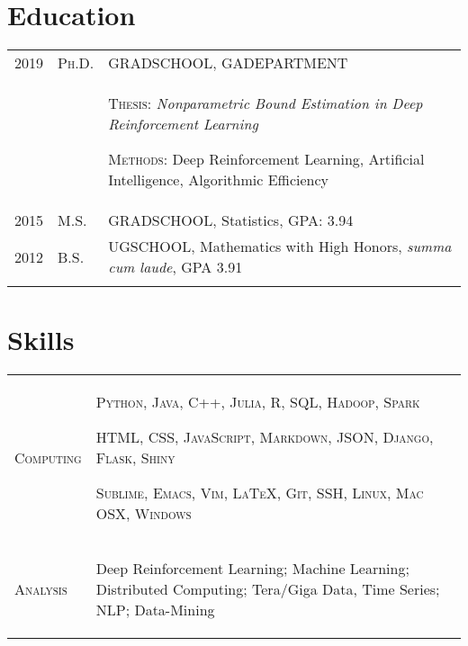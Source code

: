 \documentclass[a4paper,10pt]{article}
\begin{document}
\section{Education}
\begin{supertabular}{p{2cm} p{1.0cm} p{13.9cm}}
	\textsc{2019}		&		\textsc{Ph.D.} & \textsc{GRADSCHOOL}, \small GADEPARTMENT \\
					&&		 \begin{enumerate*}[label =$\circ$, itemjoin={\newline}] 
							 \item \footnotesize \textsc{Thesis:} \emph{Nonparametric Bound Estimation in Deep Reinforcement Learning} 
							 \item \footnotesize  \textsc{Methods:} Deep Reinforcement Learning, Artificial Intelligence, Algorithmic Efficiency
							 \end{enumerate*}  \\
	\textsc{2015} 	& 	\textsc{M.S.} & \textsc{GRADSCHOOL}, \small Statistics, GPA: 3.94  \\
	\textsc{2012} 	& 	\textsc{B.S.} & \textsc{UGSCHOOL}, \small Mathematics with High Honors, \emph{summa cum laude}, GPA 3.91 \\
	 \\
\end{supertabular}


\section{Skills}
\begin{supertabular}{p{3.4cm} p{13.9cm}}

	\textsc{Computing}			& \begin{enumerate*}[label =$\circ$, itemjoin={\newline}]
																\item \small \textsc{Python, Java, C++, Julia, R, SQL, Hadoop, Spark}
																\item \small \textsc{HTML, CSS, JavaScript, Markdown, JSON, Django, Flask, Shiny}
																\item \small \textsc{Sublime, Emacs, Vim, {\fb \LaTeX}, Git, SSH, Linux, Mac OSX, Windows }
																\end{enumerate*} \vspace{2mm} \\


	\textsc{Analysis}				& \begin{enumerate*}[label =$\circ$, itemjoin={\newline}]
                                \item \small Deep Reinforcement Learning; Machine Learning; Distributed Computing; Tera/Giga Data, Time Series; NLP; Data-Mining \end{enumerate*}  \vspace{1mm} \\



\end{supertabular}
\end{document}
